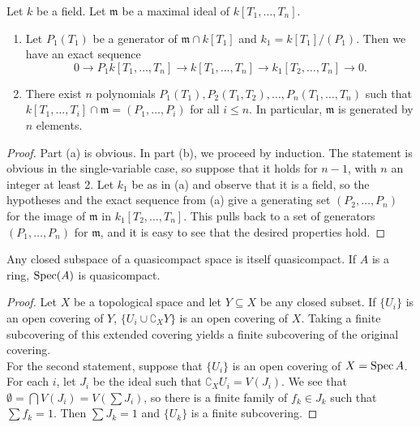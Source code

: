 \begin{exer}
	Let $k$ be a field. Let $\mathfrak m$ be a maximal ideal of
	$k[T_1,\ldots,T_n].$
	\begin{enumerate}[label=(\alph*)]
		\item Let $P_1(T_1)$ be a generator of $\mathfrak m \cap k[T_1]$
			and $k_1 = k[T_1]/(P_1)$. Then we have an exact sequence
			\[
				0 \to P_1k[T_1,\ldots,T_n] \to k[T_1,\ldots,T_n]
				\to k_1[T_2,\ldots,T_n] \to 0.
			\]
		\item There exist $n$ polynomials $P_1(T_1),P_2(T_1,T_2),\ldots
			,P_n(T_1,\ldots,T_n)$ such that
			$k[T_1,\dots,T_i] \cap \mathfrak m = (P_1,\ldots,P_i)$
			for all $i \leq n$. In particular, $\mathfrak m$ is
			generated by $n$ elements.
	\end{enumerate}
\end{exer}
\begin{proof}
	Part (a) is obvious. In part (b), we proceed by induction. The statement
	is obvious in the single-variable case, so suppose that it holds for
	$n - 1$, with $n$ an integer at least 2. Let $k_1$ be as in (a) and
	observe that it is a field, so the hypotheses and the exact sequence
	from (a) give a generating set $(P_2,\ldots,P_n)$ for the image of
	$\mathfrak m$ in $k_1[T_2,\ldots,T_n]$. This pulls back to a set of
	generators $(P_1,\ldots,P_n)$ for $\mathfrak m$, and it is easy to see
	that the desired properties hold.
\end{proof}

\begin{exer}
	Any closed subspace of a quasicompact space is itself quasicompact.
	If $A$ is a ring, $\operatorname{Spec}(A)$ is quasicompact.
\end{exer}
\begin{proof}
	Let $X$ be a topological space and let $Y \subseteq X$ be any closed
	subset. If $\{ U_i \}$ is an open covering of $Y$, 
	$\{ U_i \cup \complement_X Y \}$ is an open covering of $X$. Taking a
	finite subcovering of this extended covering yields a finite subcovering
	of the original covering.\\

	For the second statement, suppose that $\{ U_i \}$ is an open covering
	of $X = \operatorname{Spec} A$. For each $i$, let $J_i$ be the ideal such that
	$\complement_X U_i = V(J_i)$. We see that $\emptyset = \bigcap V(J_i) 
	= V(\sum J_i)$, so there is a finite family of $f_k \in J_k$ such that
	$\sum f_k = 1$. Then $\sum J_k = 1$ and $\{ U_k \}$ is a finite
	subcovering.
\end{proof}

